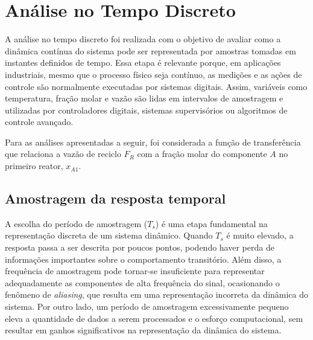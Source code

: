 \section{Análise no Tempo Discreto}

A análise no tempo discreto foi realizada com o objetivo de avaliar como a dinâmica contínua do sistema pode ser representada por amostras tomadas em instantes definidos de tempo.
Essa etapa é relevante porque, em aplicações industriais, mesmo que o processo físico seja contínuo, as medições e as ações de controle são normalmente executadas por sistemas digitais.
Assim, variáveis como temperatura, fração molar e vazão são lidas em intervalos de amostragem e utilizadas por controladores digitais, sistemas supervisórios ou algoritmos de controle avançado.

Para as análises apresentadas a seguir, foi considerada a função de transferência que relaciona a vazão de reciclo $F_R$ com a fração molar do componente $A$ no primeiro reator, $x_{A1}$.



\subsection{Amostragem da resposta temporal}

A escolha do período de amostragem ($T_s$) é uma etapa fundamental na representação discreta de um sistema dinâmico.
Quando $T_s$ é muito elevado, a resposta passa a ser descrita por poucos pontos, podendo haver perda de informações importantes sobre o comportamento transitório.
Além disso, a frequência de amostragem pode tornar-se insuficiente para representar adequadamente as componentes de alta frequência do sinal, ocasionando o fenômeno de \textit{aliasing}, que resulta em uma representação incorreta da dinâmica do sistema.
Por outro lado, um período de amostragem excessivamente pequeno eleva a quantidade de dados a serem processados e o esforço computacional, sem resultar em ganhos significativos na representação da dinâmica do sistema.

